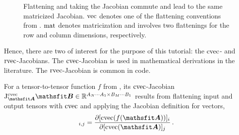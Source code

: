 \begin{figure}[!h]
  \centering
  \caption{Flattening and taking the Jacobian commute and lead to the same matricized Jacobian.
    $\vec$ denotes one of the flattening conventions from .
    $\mat$ denotes matricization and involves two flattenings for the row and column dimensions, respectively.}
\end{figure}

Hence, there are two of interest for the purpose of this tutorial: the $\cvec$- and $\rvec$-Jacobians.
The $\cvec$-Jacobian is used in mathematical derivations in the literature.
The $\rvec$-Jacobian is common in code.

\begin{definition}\label{def:cvec_jacobian}
  For a tensor-to-tensor function $f$ from , its $\cvec$-Jacobian $\jac^{\cvec}_{\tA}\tB \in \sR^{A_N \cdots A_1 \times B_M \cdots B_1}$ results from flattening input and output tensors with $\cvec$ and applying the Jacobian definition for vectors,
  \begin{align*}
    [\jac^{\cvec}_{\tA}\tB]_{i,j}
    =
    \frac{\partial [\cvec(f(\tA))]_i}{\partial [\cvec(\tA)]_j}\,.
  \end{align*}
\end{definition}

